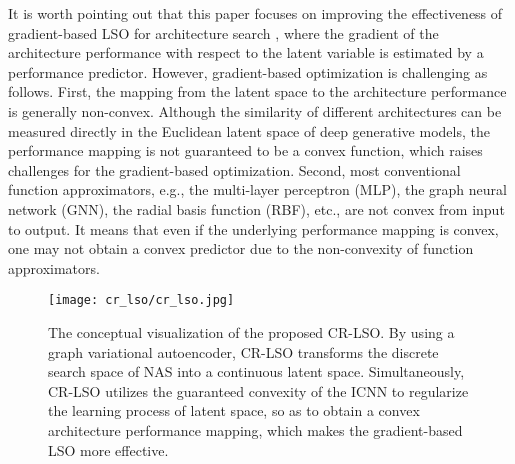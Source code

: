 \documentclass[10pt,twocolumn,letterpaper]{article}
\begin{document}
It is worth pointing out that this paper focuses on improving the effectiveness of gradient-based LSO for architecture search \cite{luo2018neural}, where the gradient of the architecture performance with respect to the latent variable is estimated by a performance predictor. However, gradient-based optimization is challenging as follows. First, the mapping from the latent space to the architecture performance is generally non-convex. Although the similarity of different architectures can be measured directly in the Euclidean latent space of deep generative models, the performance mapping is not guaranteed to be a convex function, which raises challenges for the gradient-based optimization. Second, most conventional function approximators, e.g., the multi-layer perceptron (MLP), the graph neural network (GNN), the radial basis function (RBF), etc., are not convex from input to output. It means that even if the underlying performance mapping is convex, one may not obtain a convex predictor due to the non-convexity of function approximators. 
\begin{figure}[htbp]
	\centering
	\texttt{[image: cr\_lso/cr\_lso.jpg]}
	\caption{The conceptual visualization of the proposed CR-LSO. By using a graph variational autoencoder, CR-LSO transforms the discrete search space of NAS into a continuous latent space. Simultaneously, CR-LSO utilizes the guaranteed convexity of the ICNN to regularize the learning process of latent space, so as to obtain a convex architecture performance mapping, which makes the gradient-based LSO more effective.}
	\label{fig:cr_lso}
\end{figure}
\end{document}
